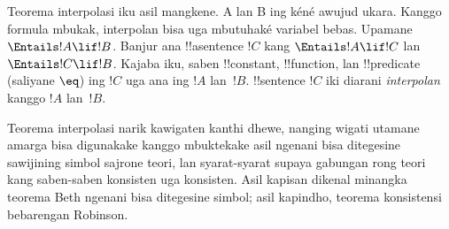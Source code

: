 \documentclass[../../../include/open-logic-section]{subfiles}
\begin{document}


Teorema interpolasi iku asil mangkene. A lan B ing kéné awujud ukara. Kanggo formula mbukak, interpolan bisa uga mbutuhaké variabel bebas. Upamane
$\Entails !A \lif !B$. Banjur ana !!a{sentence} $!C$ kang
$\Entails !A \lif !C$ lan $\Entails !C \lif !B$. Kajaba iku, saben
!!{constant}, !!{function}, lan !!{predicate} (saliyane $\eq$) ing
$!C$ uga ana ing $!A$ lan~$!B$. !!{sentence} $!C$ iki diarani
\emph{interpolan} kanggo $!A$ lan~$!B$.

Teorema interpolasi narik kawigaten kanthi dhewe, nanging
wigati utamane amarga bisa digunakake kanggo mbuktekake asil
ngenani bisa ditegesine sawijining simbol sajrone teori, lan
syarat-syarat supaya gabungan rong teori kang saben-saben
konsisten uga konsisten. Asil kapisan dikenal minangka
teorema Beth ngenani bisa ditegesine simbol; asil kapindho,
teorema konsistensi bebarengan Robinson.
\end{document}
